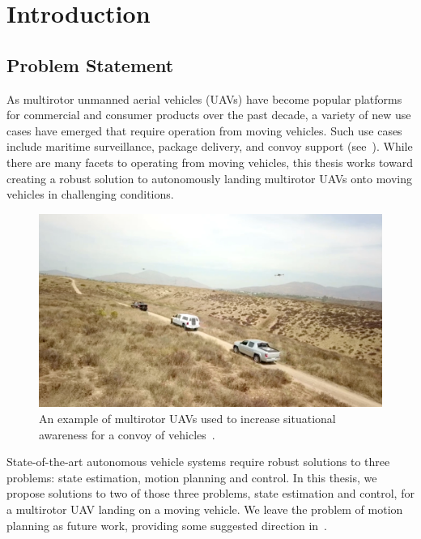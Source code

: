 
\chapter{Introduction}
\label{chp:introduction}

\section{Problem Statement}
As multirotor unmanned aerial vehicles (UAVs) have become popular
platforms for commercial and consumer products over the past decade, a variety
of new use cases have emerged that require operation from moving vehicles.
Such use cases include
maritime surveillance, package delivery, and convoy
support (see~). While there are
many facets to operating from moving vehicles, this thesis works toward creating
a robust solution to autonomously landing multirotor UAVs onto moving vehicles
in challenging conditions.

\begin{figure}[h]
  \centering
  \includegraphics[width=5.5in]{figures/drone_convoy_support.png}
  \caption[UAV Convoy Support]{An example of multirotor UAVs used to increase
  situational awareness for a convoy of
vehicles~\cite{ground_vehicle_based_drones}.}
%
  \label{fig:drone_convoy_support}
\end{figure}

State-of-the-art autonomous vehicle systems require robust solutions to three
problems: state estimation, motion planning and control. In this thesis,
we propose solutions to two of those three problems, state estimation and
control, for a multirotor UAV landing on a moving vehicle. We leave the problem
of motion planning as future work, providing some suggested direction
in~.

